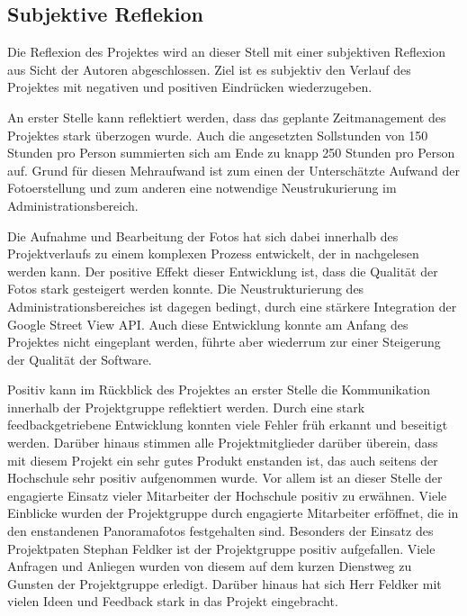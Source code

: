 \subsection{Subjektive Reflekion}
\label{sec:SubjektiveReflekion}

Die Reflexion des Projektes wird an dieser Stell mit 
einer subjektiven Reflexion aus Sicht der Autoren abgeschlossen. Ziel ist
es subjektiv den Verlauf des Projektes mit negativen und positiven Eindrücken
wiederzugeben.

An erster Stelle kann reflektiert werden, dass das geplante Zeitmanagement
des Projektes stark überzogen wurde. Auch die angesetzten Sollstunden von
150 Stunden pro Person summierten sich am Ende zu knapp 250 Stunden pro Person auf.
Grund für diesen Mehraufwand ist zum einen der Unterschätzte Aufwand der 
Fotoerstellung und zum anderen eine notwendige Neustrukurierung im 
Administrationsbereich.

Die Aufnahme und Bearbeitung der Fotos hat sich dabei innerhalb des
Projektverlaufs zu einem komplexen Prozess entwickelt, der in
\citet{modelierungUndBetrieb2014} nachgelesen werden kann. Der
positive Effekt dieser Entwicklung ist, dass die
Qualität der Fotos stark gesteigert werden konnte.
Die Neustrukturierung des Administrationsbereiches ist dagegen bedingt, durch eine stärkere
Integration der Google Street View API. Auch diese Entwicklung konnte am Anfang des Projektes
nicht eingeplant werden, führte aber wiederrum zur einer Steigerung der Qualität der Software.

Positiv kann im Rückblick des Projektes an erster Stelle die Kommunikation
innerhalb der Projektgruppe reflektiert werden. Durch eine stark feedbackgetriebene
Entwicklung konnten viele Fehler früh erkannt und beseitigt werden.
Darüber hinaus stimmen alle Projektmitglieder darüber überein, dass mit diesem
Projekt ein sehr gutes Produkt enstanden ist, das auch seitens der Hochschule
sehr positiv aufgenommen wurde. Vor allem ist an dieser Stelle der engagierte Einsatz
vieler Mitarbeiter der Hochschule positiv zu erwähnen. Viele Einblicke wurden der
Projektgruppe durch engagierte Mitarbeiter erföffnet, die in den enstandenen Panoramafotos festgehalten sind.
Besonders der Einsatz des Projektpaten Stephan Feldker ist der Projektgruppe positiv aufgefallen.
Viele Anfragen und Anliegen wurden von diesem auf dem kurzen Dienstweg zu Gunsten der Projektgruppe
erledigt. Darüber hinaus hat sich Herr Feldker mit vielen Ideen und Feedback stark in das Projekt
eingebracht.